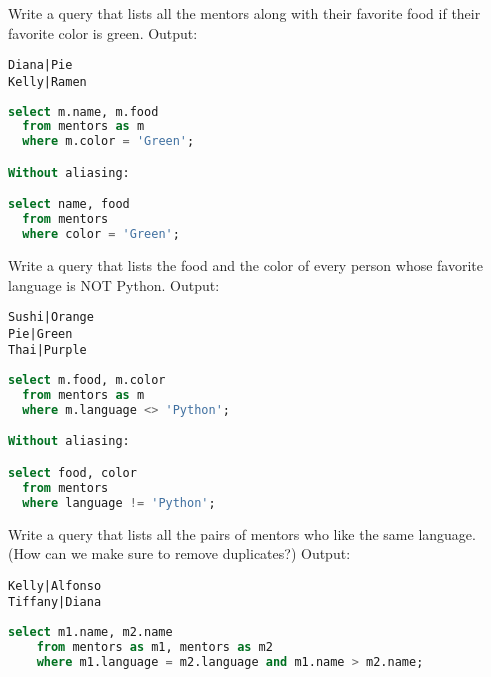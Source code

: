 \documentclass{exam}
\begin{document}
\begin{questions}
\begin{blocksection}
\question Write a query that lists all the mentors along with their favorite food if their favorite color is green.\newline
Output:
\begin{lstlisting}
Diana|Pie
Kelly|Ramen
\end{lstlisting}
\begin{solution}[1in]
\begin{lstlisting}[language=SQL]
select m.name, m.food
  from mentors as m
  where m.color = 'Green';

Without aliasing:

select name, food
  from mentors
  where color = 'Green';
\end{lstlisting}
\end{solution}

\question Write a query that lists the food and the color of every person whose
favorite language is NOT Python. \newline
Output:
\begin{lstlisting}
Sushi|Orange
Pie|Green
Thai|Purple
\end{lstlisting}
\begin{solution}[1in]
\begin{lstlisting}[language=SQL]
select m.food, m.color
  from mentors as m
  where m.language <> 'Python';

Without aliasing:

select food, color
  from mentors
  where language != 'Python';
\end{lstlisting}
\end{solution}
\end{blocksection}

\begin{blocksection}
\question Write a query that lists all the pairs of mentors who like the same language. (How can we make sure to remove duplicates?) \newline
Output:
\begin{lstlisting}
Kelly|Alfonso
Tiffany|Diana
\end{lstlisting}
\begin{solution}[2in]
\begin{lstlisting}[language=SQL]
select m1.name, m2.name
    from mentors as m1, mentors as m2
    where m1.language = m2.language and m1.name > m2.name;
\end{lstlisting}
\end{solution}


\end{blocksection}
\end{questions}
\end{document}
